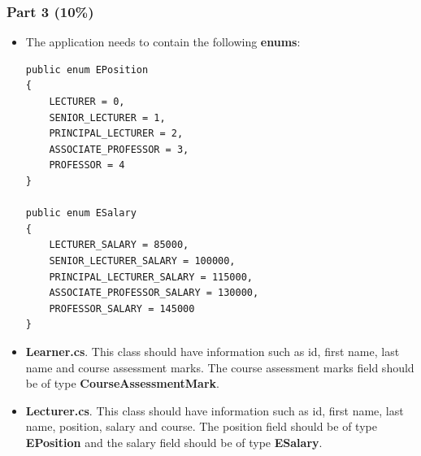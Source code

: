 \documentclass{article}
\begin{document}
\subsubsection*{Part 3 (10\%)}

\begin{itemize}
    \item The application needs to contain the following \textbf{enums}:
    \begin{verbatim}
public enum EPosition
{
    LECTURER = 0,
    SENIOR_LECTURER = 1,
    PRINCIPAL_LECTURER = 2,
    ASSOCIATE_PROFESSOR = 3,
    PROFESSOR = 4
}
            
public enum ESalary
{
    LECTURER_SALARY = 85000,
    SENIOR_LECTURER_SALARY = 100000,
    PRINCIPAL_LECTURER_SALARY = 115000,
    ASSOCIATE_PROFESSOR_SALARY = 130000,
    PROFESSOR_SALARY = 145000
}
    \end{verbatim}
    \item \textbf{Learner.cs}. This class should have information such as id, first name, last name and course assessment marks. The course assessment marks field should be of type \textbf{CourseAssessmentMark}.
    \item \textbf{Lecturer.cs}. This class should have information such as id, first name, last name, position, salary and course. The position field should be of type \textbf{EPosition} and the salary field should be of type \textbf{ESalary}.
\end{itemize}
\end{document}
